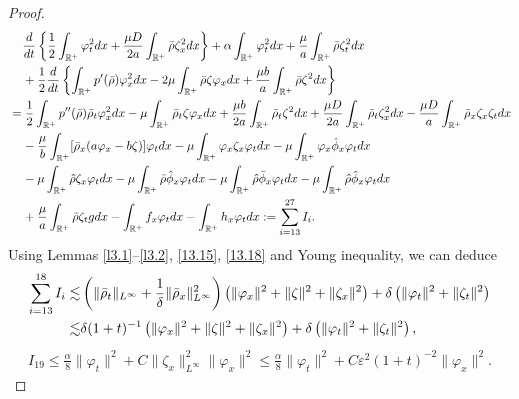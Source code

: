 \documentclass[10pt,a4paper]{amsart}
\begin{document}
\begin{proof}
		\begin{align}\label{38}
			&\;\;\;\;	\frac{{\rm d}}{{\rm d}t}\left\{\frac{1}{2}\int_{\mathbb{R}^+}\varphi_t^2{\rm d}x	+\frac{\mu D}{2a}\int_{\mathbb{R}^+}^{}\bar\rho\zeta_x^2{\rm d}x\right\}+\alpha\int_{\mathbb{R}^+}\varphi_t^2{\rm d}x+\frac{\mu}{a}\int_{\mathbb{R}^+}^{}\bar\rho\zeta_t^2{\rm d}x\notag\\
			&\;\;\;\;+\frac{1}{2}	\frac{{\rm d}}{{\rm d}t}\left\{\int_{\mathbb{R}^+}p^{\prime}(\bar\rho)\varphi_x^2{\rm d}x-2\mu\int_{\mathbb{R}^+}\bar\rho\zeta\varphi_x{\rm d}x+\frac{\mu b}{a}\int_{\mathbb{R}^+}^{}\bar\rho\zeta^2{\rm d}x\right\}\notag\\
			&=\frac{1}{2}\int_{\mathbb{R}^+}p^{\prime\prime}(\bar\rho)\bar\rho_t\varphi_x^2{\rm d}x-\mu\int_{\mathbb{R}^+}\bar\rho_t\zeta\varphi_x{\rm d}x+\frac{\mu b}{2a}\int_{\mathbb{R}^+}^{}\bar\rho_t\zeta^2{\rm d}x+\frac{\mu D}{2a}\int_{\mathbb{R}^+}^{}\bar\rho_t\zeta_x^2{\rm d}x
			-\frac{\mu D}{a}\int_{\mathbb{R}^+}^{}\bar\rho_x\zeta_x\zeta_t {\rm d}x\notag\\
			&\;\;\;\;-\frac{\mu}{b}\int_{\mathbb{R}^+}[\bar\rho_x(a\varphi_x-b\zeta)]\varphi_t{\rm d}x-\mu\int_{\mathbb{R}^+}\varphi_x\zeta_x\varphi_t{\rm d}x-\mu\int_{\mathbb{R}^+}\varphi_x\hat\phi_x\varphi_t{\rm d}x\notag\\
			&\;\;\;\;	-\mu\int_{\mathbb{R}^+}\hat\rho\zeta_x\varphi_t{\rm d}x-\mu\int_{\mathbb{R}^+}\bar\rho\hat\phi_x\varphi_t{\rm d}x-\mu\int_{\mathbb{R}^+}\hat\rho\bar\phi_x\varphi_t{\rm d}x-\mu\int_{\mathbb{R}^+}\hat\rho\hat\phi_x\varphi_t{\rm d}x\notag\\
			&\;\;\;\;+\frac{\mu}{a}\int_{\mathbb{R}^+}^{}\bar\rho\zeta_tg {\rm d}x-\int_{\mathbb{R}^+}f_x\varphi_t{\rm d}x-\int_{\mathbb{R}^+}h_x\varphi_t{\rm d}x:=\sum_{i=13}^{27}I_i.
		\end{align}
		Using Lemmas \ref{l3.1}--\ref{l3.2}, \eqref{13.15}, \eqref{13.18} and Young inequality, we can deduce
		\begin{align}\label{J18}
			\sum_{i=13}^{18}I_i\lesssim&
			\left(\|\bar\rho_t\|_{L^{\infty}}+\frac{1}{\delta}\|\bar\rho_x\|_{L^{\infty}}^2\right)\left(\|\varphi_x\|^2+\|\zeta\|^2+\|\zeta_x\|^2\right)
			+\delta\left(\|\varphi_t\|^2+\|\zeta_t\|^2\right)
			\notag\\
			\lesssim&\delta(1+t)^{-1}\left(\|\varphi_x\|^2+\|\zeta\|^2+\|\zeta_x\|^2\right)
			+\delta\left(\|\varphi_t\|^2+\|\zeta_t\|^2\right),
		\end{align}
		\begin{align}\label{K9}
			I_{19}\leq \frac{\alpha}{8}\|\varphi_t\|^2+C\|\zeta_x\|_{L^{\infty}}^2\|\varphi_x\|^2\leq \frac{\alpha}{8}\|\varphi_t\|^2+C\varepsilon^2(1+t)^{-2}\|\varphi_x\|^2.

\end{align}
\end{proof}
\end{document}
